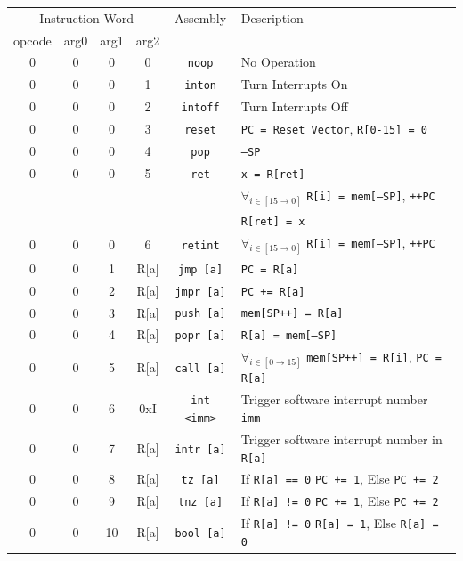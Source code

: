 \documentclass{article}
\begin{document}
\begin{table}[h!]
	\centering
	\begin{footnotesize}
		\begin{tabular}{cccc|c|l}
			\hline
			\multicolumn{4}{c|}{Instruction Word} & Assembly & Description \\
			opcode & arg0 & arg1 & arg2 & & \\
			\hline
			0 & 0 & 0 & 0 & \texttt{noop} & No Operation \\
			0 & 0 & 0 & 1 & \texttt{inton} & Turn Interrupts On \\
			0 & 0 & 0 & 2 & \texttt{intoff} & Turn Interrupts Off \\
			0 & 0 & 0 & 3 & \texttt{reset} & \texttt{PC = Reset Vector}, \texttt{R[0-15] = 0} \\
			0 & 0 & 0 & 4 & \texttt{pop} & \texttt{--SP} \\
			0 & 0 & 0 & 5 & \texttt{ret} & \texttt{x = R[ret]} \\
			{} & {} & {} & {} & {} & $\forall_{i \in [15 \rightarrow 0]}$ \texttt{R[i] = mem[--SP]}, \texttt{++PC} \\
			{} & {} & {} & {} & {} & \texttt{R[ret] = x} \\
			0 & 0 & 0 & 6 & \texttt{retint} & $\forall_{i \in [15 \rightarrow 0]}$ \texttt{R[i] = mem[--SP]}, \texttt{++PC} \\
			0 & 0 & 1 & R[a] & \texttt{jmp [a]} & \texttt{PC = R[a]} \\
			0 & 0 & 2 & R[a] & \texttt{jmpr [a]} & \texttt{PC += R[a]} \\
			0 & 0 & 3 & R[a] & \texttt{push [a]} & \texttt{mem[SP++] = R[a]} \\
			0 & 0 & 4 & R[a] & \texttt{popr [a]} & \texttt{R[a] = mem[--SP]} \\
			0 & 0 & 5 & R[a] & \texttt{call [a]} & $\forall_{i \in [0 \rightarrow 15]}$
			 \texttt{mem[SP++] = R[i]}, \texttt{PC = R[a]} \\
 			0 & 0 & 6 & 0xI & \texttt{int <imm>} & Trigger software interrupt number \texttt{imm} \\
 			0 & 0 & 7 & R[a] & \texttt{intr [a]} & Trigger software interrupt number in \texttt{R[a]} \\
 			0 & 0 & 8 & R[a] & \texttt{tz [a]} & If \texttt{R[a] == 0} \texttt{PC += 1}, Else \texttt{PC += 2} \\
 			0 & 0 & 9 & R[a] & \texttt{tnz [a]} & If \texttt{R[a] != 0} \texttt{PC += 1}, Else \texttt{PC += 2} \\
 			0 & 0 & 10 & R[a] & \texttt{bool [a]} & If \texttt{R[a] != 0} \texttt{R[a] = 1}, Else \texttt{R[a] = 0} \\

\end{tabular}
\end{footnotesize}
\end{table}
\end{document}
